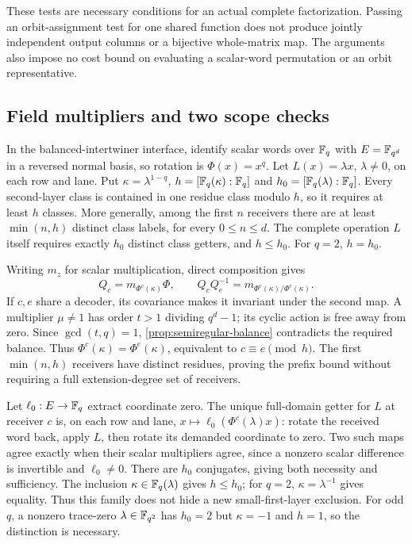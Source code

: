 These tests are necessary conditions for an actual complete factorization.
Passing an orbit-assignment test for one shared function does not produce
jointly independent output columns or a bijective whole-matrix map.
The arguments also impose no cost bound on evaluating a scalar-word
permutation or an orbit representative.

\subsection{Field multipliers and two scope checks}

\begin{proposition}\label{prop:multiplier-classes}
In the balanced-intertwiner interface, identify scalar words over $\mathbb{F}_q$
with $E=\mathbb{F}_{q^d}$ in a reversed normal basis, so rotation is
$\Phi(x)=x^q$. Let $L(x)=\lambda x$, $\lambda\ne0$, on each row and lane.
Put $\kappa=\lambda^{1-q}$, $h=[\mathbb{F}_q(\kappa):\mathbb{F}_q]$ and
$h_0=[\mathbb{F}_q(\lambda):\mathbb{F}_q]$. Every second-layer class is contained in
one residue class modulo $h$, so it requires at least $h$ classes.
More generally, among the first $n$ receivers there are at least
$\min(n,h)$ distinct class labels, for every $0\le n\le d$.
The complete operation $L$ itself requires exactly $h_0$ distinct class
getters, and $h\le h_0$. For $q=2$, $h=h_0$.
\end{proposition}
\begin{outline}
Writing $m_z$ for scalar multiplication, direct composition gives
\[
 Q_c=m_{\Phi^c(\kappa)}\Phi,\qquad
 Q_cQ_e^{-1}=m_{\Phi^c(\kappa)/\Phi^e(\kappa)}.
\]
If $c,e$ share a decoder, its covariance makes it invariant under the
second map. A multiplier $\mu\ne1$ has order $t>1$ dividing $q^d-1$;
its cyclic action is free away from zero. Since $\gcd(t,q)=1$,
\cref{prop:semiregular-balance} contradicts the required balance. Thus
$\Phi^c(\kappa)=\Phi^e(\kappa)$, equivalent to $c\equiv e\pmod h$.
The first $\min(n,h)$ receivers have distinct residues, proving the prefix
bound without requiring a full extension-degree set of receivers.

Let $\ell_0:E\to\mathbb{F}_q$ extract coordinate zero. The unique full-domain
getter for $L$ at receiver $c$ is, on each row and lane,
$x\mapsto\ell_0(\Phi^c(\lambda)x)$: rotate the received word back,
apply $L$, then rotate its demanded coordinate to zero. Two such maps
agree exactly when their scalar multipliers agree, since a nonzero
scalar difference is invertible and $\ell_0\ne0$. There are $h_0$
conjugates, giving both necessity and sufficiency. The inclusion
$\kappa\in\mathbb{F}_q(\lambda)$ gives $h\le h_0$; for $q=2$,
$\kappa=\lambda^{-1}$ gives equality. Thus this family does not hide a
new small-first-layer exclusion. For odd $q$, a nonzero trace-zero
$\lambda\in\mathbb{F}_{q^2}$ has $h_0=2$ but $\kappa=-1$ and $h=1$,
so the distinction is necessary.
\end{outline}

